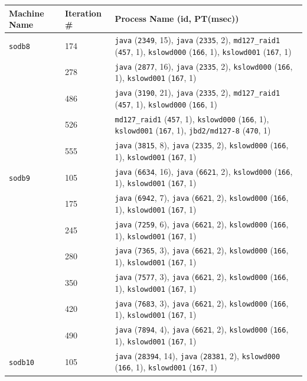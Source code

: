 \begin{table}[htp!]
\centering
{
 \begin{tabular}{|p{1.5cm}|p{2cm}|p{12.5cm}|} \hline
Machine Name & Iteration \# & Process Name (id, PT(msec))\\ \hline
{\tt sodb8}  & 174 & {\tt java} ({\tt 2349}, 15), {\tt java} ({\tt 2335}, 2),  {\tt md127\_raid1} ({\tt 457}, 1), {\tt kslowd000} ({\tt 166}, 1), {\tt kslowd001} ({\tt 167}, 1) \\ \cline{2-3}
 					& 278 & {\tt java} ({\tt 2877}, 16), {\tt java} ({\tt 2335}, 2),  {\tt kslowd000} ({\tt 166}, 1), {\tt kslowd001} ({\tt 167}, 1) \\ \cline{2-3}
			  &  486 & {\tt java} ({\tt 3190}, 21), {\tt java} ({\tt 2335}, 2),  {\tt md127\_raid1} ({\tt 457}, 1), {\tt kslowd000} ({\tt 166}, 1)\\ \cline{2-3}
				  &  526 & {\tt md127\_raid1} ({\tt 457}, 1), {\tt kslowd000} ({\tt 166}, 1), {\tt kslowd001} ({\tt 167}, 1), {\tt jbd2/md127-8} ({\tt 470}, 1)\\ \cline{2-3}
				  &  555 & {\tt java} ({\tt 3815}, 8), {\tt java} ({\tt 2335}, 2), {\tt kslowd000} ({\tt 166}, 1), {\tt kslowd001} ({\tt 167}, 1)\\ \hline
{\tt sodb9}  & 105 & {\tt java} ({\tt 6634}, 16), {\tt java} ({\tt 6621}, 2),  {\tt kslowd000} ({\tt 166}, 1), {\tt kslowd001} ({\tt 167}, 1) \\ \cline{2-3}
				  & 175 & {\tt java} ({\tt 6942}, 7), {\tt java} ({\tt 6621}, 2),  {\tt kslowd000} ({\tt 166}, 1), {\tt kslowd001} ({\tt 167}, 1) \\ \cline{2-3}
				  & 245 & {\tt java} ({\tt 7259}, 6), {\tt java} ({\tt 6621}, 2),  {\tt kslowd000} ({\tt 166}, 1), {\tt kslowd001} ({\tt 167}, 1) \\ \cline{2-3}
				  & 280 & {\tt java} ({\tt 7365}, 3), {\tt java} ({\tt 6621}, 2),  {\tt kslowd000} ({\tt 166}, 1), {\tt kslowd001} ({\tt 167}, 1) \\ \cline{2-3}
				  & 350 & {\tt java} ({\tt 7577}, 3), {\tt java} ({\tt 6621}, 2),  {\tt kslowd000} ({\tt 166}, 1), {\tt kslowd001} ({\tt 167}, 1) \\ \cline{2-3}
				  & 420 & {\tt java} ({\tt 7683}, 3), {\tt java} ({\tt 6621}, 2),  {\tt kslowd000} ({\tt 166}, 1), {\tt kslowd001} ({\tt 167}, 1) \\ \cline{2-3}
				  & 490 & {\tt java} ({\tt 7894}, 4), {\tt java} ({\tt 6621}, 2),  {\tt kslowd000} ({\tt 166}, 1), {\tt kslowd001} ({\tt 167}, 1) \\ \hline
{\tt sodb10}  & 105 & {\tt java} ({\tt 28394}, 14), {\tt java} ({\tt 28381}, 2),  {\tt kslowd000} ({\tt 166}, 1), {\tt kslowd001} ({\tt 167}, 1) \\ \cline{2-3}

\end{tabular}}
\end{table}
